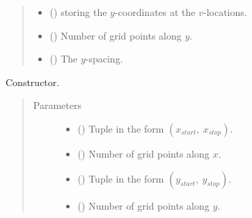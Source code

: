 \documentclass[letterpaper,10pt,english]{sphinxmanual}
\begin{document}
\begin{fulllineitems}
\begin{quote}
\begin{description}
\begin{itemize}
\item {} 
{\hyperref[\detokenize{api:grids.grid_xyz.GridXYZ.y_at_v_locations}]{}} () \textendash{} {\hyperref[\detokenize{api:grids.axis.Axis}]{}} storing the \(y\)-coordinates at the \(v\)-locations.

\item {} 
{\hyperref[\detokenize{api:grids.grid_xyz.GridXYZ.ny}]{}} () \textendash{} Number of grid points along \(y\).

\item {} 
{\hyperref[\detokenize{api:grids.grid_xyz.GridXYZ.dy}]{}} () \textendash{} The \(y\)-spacing.

\end{itemize}

\end{description}\end{quote}

\begin{fulllineitems}
\label{\detokenize{api:grids.grid_xy.GridXY.__init__}}
Constructor.
\begin{quote}\begin{description}
\item[{Parameters}] \leavevmode\begin{itemize}
\item {} 
 () \textendash{} Tuple in the form \((x_{start}, ~ x_{stop})\).

\item {} 
 () \textendash{} Number of grid points along \(x\).

\item {} 
 () \textendash{} Tuple in the form \((y_{start}, ~ y_{stop})\).

\item {} 
 () \textendash{} Number of grid points along \(y\).


\end{itemize}
\end{description}
\end{quote}
\end{fulllineitems}
\end{fulllineitems}
\end{document}
